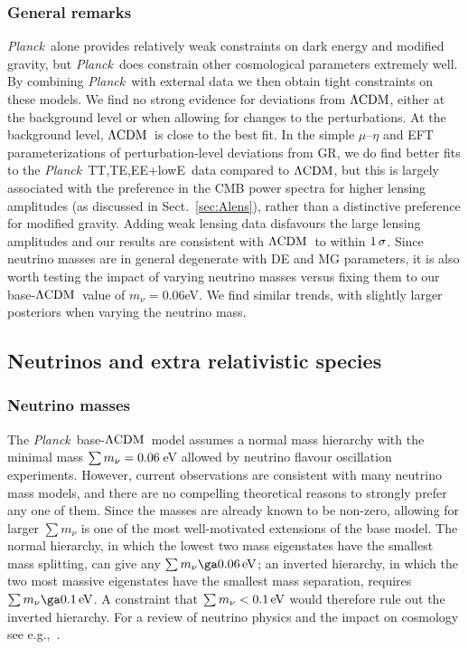 \documentclass[longauth,traditabstract]{aa}
\def\Planck{\textit{Planck}}
\def\,{\thinspace}
\newcommand{\mksym}[1]{\ifmmode {\rm #1}\else #1\fi}
\newcommand{\dataplus}{\allowbreak+}
\newcommand{\TTTEEE}{\mksym{TT,TE,EE}}
\newcommand{\planckTTTEEEonly}{\planck\ \TTTEEE}
\newcommand{\lowE}{\mksym{lowE}}
\newcommand{\planckall}{\planckTTTEEEonly\dataplus\lowE}
\newcommand{\lcdm}{\texorpdfstring{{$\rm{\Lambda CDM}$}}{ΛCDM}}
\providecommand{\text}[1]{\rm{#1}}
\newcommand{\eV}{\,\text{eV}}
\newcommand{\planck}{\Planck}
\begin{document}
\subsubsection{General remarks}

\planck\ alone provides relatively weak constraints on dark energy and modified gravity, but \Planck\ does constrain other cosmological parameters extremely well. By combining \Planck\ with external data we then obtain tight constraints on these
models. We find no strong evidence for deviations from \lcdm, either at the background level or when allowing for changes to the perturbations. At the background level, \lcdm\ is close to the best fit. In the simple $\mu$--$\eta$ and EFT parameterizations of perturbation-level deviations from GR, we do find better fits to the \planckall\ data compared to \lcdm,
but this is largely associated with the preference in the CMB power spectra for higher lensing amplitudes (as discussed in Sect.~\ref{sec:Alens}), rather than a distinctive preference for modified gravity. Adding weak lensing data disfavours the large lensing amplitudes and our results are consistent with \lcdm\ to within  $1\,\sigma$.
Since neutrino masses are in general degenerate with DE and MG parameters, it is also worth testing the impact of varying neutrino masses versus fixing them to our base-\lcdm\ value of $m_\nu = 0.06$\,eV. We find similar trends, with slightly
larger posteriors when varying the neutrino mass.

\subsection{Neutrinos and extra relativistic species}\label{sec:neutrinos}
\newcommand{\JL}[1]{\textcolor{Brown}{$\triangleleft$ JL: #1 $\triangleright$}}

\subsubsection{Neutrino masses}
\label{subsec:mnu}

The \Planck\ base-\lcdm\ model assumes a normal mass hierarchy
with the minimal mass $\sum m_\nu= 0.06\,$eV allowed by neutrino flavour oscillation experiments.  However, current observations are consistent with many neutrino mass models, and there are no compelling theoretical reasons to
strongly prefer any one of them.  Since the masses are already known to be non-zero, allowing for larger $\sum m_\nu$ is one of the most well-motivated extensions of the base model.
The normal hierarchy, in which the lowest two mass eigenstates have the smallest mass splitting, can give any $\sum m_\nu \ga 0.06\eV$; an inverted hierarchy, in which the two most massive eigenstates have the smallest mass separation, requires $\sum m_\nu \ga 0.1\eV$.  A constraint that $\sum m_\nu <0.1\eV$ would therefore rule out the inverted hierarchy. For a review of neutrino physics and the impact on cosmology see e.g.,~\citet{LesgourgueBook}.
\end{document}
